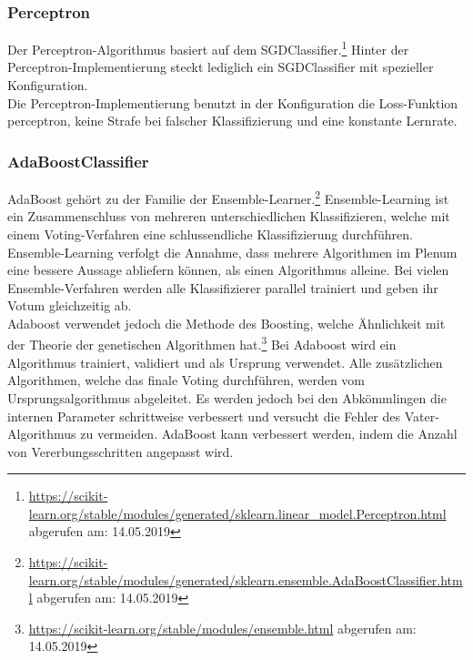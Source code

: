 \subsubsection{Perceptron}
Der Perceptron-Algorithmus basiert auf dem SGDClassifier.\footnote{\url{https://scikit-learn.org/stable/modules/generated/sklearn.linear_model.Perceptron.html} abgerufen am: 14.05.2019}
Hinter der Perceptron-Implementierung steckt lediglich ein SGDClassifier mit spezieller Konfiguration.\\
Die Perceptron-Implementierung benutzt in der Konfiguration die Loss-Funktion \glqq perceptron\grqq{}, keine Strafe bei falscher Klassifizierung und eine konstante Lernrate.
\subsubsection{AdaBoostClassifier}
AdaBoost gehört zu der Familie der Ensemble-Learner.\footnote{\url{https://scikit-learn.org/stable/modules/generated/sklearn.ensemble.AdaBoostClassifier.html} abgerufen am: 14.05.2019}
Ensemble-Learning ist ein Zusammenschluss von mehreren unterschiedlichen Klassifizieren, welche mit einem Voting-Verfahren eine schlussendliche Klassifizierung durchführen.
Ensemble-Learning verfolgt die Annahme, dass mehrere Algorithmen im Plenum eine bessere Aussage abliefern können, als einen Algorithmus alleine.
Bei vielen Ensemble-Verfahren werden alle Klassifizierer parallel trainiert und geben ihr Votum gleichzeitig ab.\\
Adaboost verwendet jedoch die Methode des \glqq Boosting\grqq{}, welche Ähnlichkeit mit der Theorie der genetischen Algorithmen hat.\footnote{\url{https://scikit-learn.org/stable/modules/ensemble.html} abgerufen am: 14.05.2019}
Bei Adaboost wird ein Algorithmus trainiert, validiert und als Ursprung verwendet. Alle zusätzlichen Algorithmen, welche das finale Voting durchführen, werden vom Ursprungsalgorithmus abgeleitet.
Es werden jedoch bei den Abkömmlingen die internen Parameter schrittweise verbessert und versucht die Fehler des \glqq Vater-Algorithmus\grqq{} zu vermeiden.
AdaBoost kann verbessert werden, indem die Anzahl von Vererbungsschritten angepasst wird.
